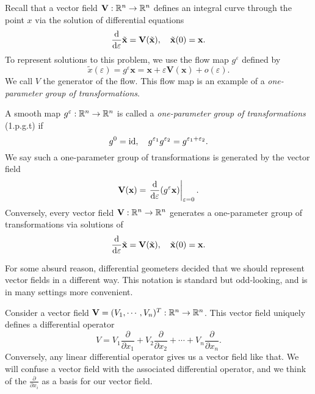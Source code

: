\documentclass[a4paper]{article}
\begin{document}
Recall that a vector field $\mathbf{V}: \mathbb{R}^n \to \mathbb{R}^n$ defines an integral curve through the point $x$ via the solution of differential equations
\[
  \frac{\mathrm{d}}{\mathrm{d} \varepsilon} \tilde{\mathbf{x}} = \mathbf{V}(\tilde{\mathbf{x}}),\quad \tilde{\mathbf{x}}(0) = \mathbf{x}.
\]
To represent solutions to this problem, we use the flow map $g^\varepsilon$ defined by
\[
  \tilde{x}(\varepsilon) = g^\varepsilon \mathbf{x} = \mathbf{x} + \varepsilon \mathbf{V}(\mathbf{x}) + o(\varepsilon).
\]
We call $V$ the generator of the flow. This flow map is an example of a \emph{one-parameter group of transformations}.
\begin{defi}
  A smooth map $g^\varepsilon: \mathbb{R}^n \to \mathbb{R}^n$ is called a \emph{one-parameter group of transformations} (1.p.g.t) if
  \[
    g^0 = \operatorname{id},\quad g^{\varepsilon_1}g^{\varepsilon_2} = g^{\varepsilon_1 + \varepsilon_2}.
  \]
  We say such a one-parameter group of transformations is generated by the vector field
  \[
    \mathbf{V}(\mathbf{x}) = \left.\frac{\mathrm{d}}{\mathrm{d} \varepsilon} (g^\varepsilon \mathbf{x}) \right|_{\varepsilon = 0}.
  \]
  Conversely, every vector field $\mathbf{V}: \mathbb{R}^n \to \mathbb{R}^n$ generates a one-parameter group of transformations via solutions of
  \[
    \frac{\mathrm{d}}{\mathrm{d} \varepsilon} \tilde{\mathbf{x}} = \mathbf{V}(\tilde{\mathbf{x}}),\quad \tilde{\mathbf{x}}(0) = \mathbf{x}.
  \]
\end{defi}
For some absurd reason, differential geometers decided that we should represent vector fields in a different way. This notation is standard but odd-looking, and is in many settings more convenient.
\begin{notation}
  Consider a vector field $\mathbf{V} = (V_1, \cdots, V_n)^T : \mathbb{R}^n \to \mathbb{R}^n$. This vector field uniquely defines a differential operator
  \[
    V = V_1 \frac{\partial}{\partial x_1} + V_2 \frac{\partial}{\partial x_2} + \cdots + V_n \frac{\partial}{\partial x_n}.
  \]
  Conversely, any linear differential operator gives us a vector field like that. We will confuse a vector field with the associated differential operator, and we think of the $\frac{\partial}{\partial x_i}$ as a basis for our vector field.
\end{notation}
\end{document}
